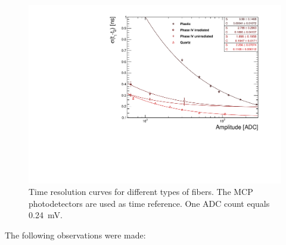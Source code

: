 \documentclass[a4paper,11pt]{article}
\begin{document}
\begin{figure}[ht]
\begin{center}
      \includegraphics[width=12cm]{Figures/fibres_time_res}
\caption{\small Time resolution curves for different types of fibers. The MCP photodetectors are used as time reference.  One ADC count equals 0.24~mV.}
    \label{fig:fibres_time_res}
\end{center}
\end{figure}
The following observations were made:
\end{document}
